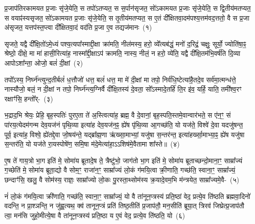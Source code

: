 \label{sec:startkanda3}
\setcounter{anuvakam}{0}
प्र॒जा\-प॑तिरकामयत प्र॒जाः सृ॑जे॒येति॒ स तपो॑\-ऽतप्यत॒ स स॒र्पान॑सृजत॒ सो॑\-ऽकामयत प्र॒जाः सृ॑जे॒येति॒ स द्वि॒तीय॑म\-तप्यत॒ स वयाꣴ॑स्यसृजत॒ सो॑\-ऽकामयत प्र॒जाः सृ॑जे॒येति॒ स तृ॒तीय॑मतप्यत॒ स ए॒तं दी᳚क्षितवा॒दम॑पश्य॒त्तम॑वद॒त्ततो॒ वै स प्र॒जा अ॑सृजत॒ यत्तप॑स्त॒प्त्वा दी᳚क्षितवा॒दं वद॑ति प्र॒जा ए॒व तद्यज॑मानः~(१)\ip

सृजते॒ यद्वै दी᳚क्षि॒तो॑\-ऽमे॒ध्यं पश्य॒त्यपा᳚स्माद्दी॒क्षा क्रा॑मति॒ नील॑मस्य॒ हरो॒ व्ये᳚त्यब॑द्धं॒ मनो॑ द॒रिद्रं॒ चक्षुः॒ सूर्यो॒ ज्योति॑षा॒ꣴ॒ श्रेष्ठो॒ दीक्षे॒ मा मा॑ हासी॒रित्या॑ह॒ नास्मा᳚द्दी॒क्षा\-ऽप॑ क्रामति॒ नास्य॒ नीलं॒ न हरो॒ व्ये॑ति॒ यद्वै दी᳚क्षि॒तम॑भि॒वर्\mbox{}ष॑ति दि॒व्या आपो\-ऽशा᳚न्ता॒ ओजो॒ बलं॑ दी॒क्षां~(२)\ip

तपो᳚\-ऽस्य॒ निर्घ्न॑न्त्युन्द॒तीर्बलं॑ ध॒त्तौजो॑ धत्त॒ बलं॑ धत्त॒ मा मे॑ दी॒क्षां मा तपो॒ निर्व॑धि॒ष्टेत्या॑है॒तदे॒व सर्व॑मा॒त्मन्ध॑त्ते॒ नास्यौजो॒ बलं॒ न दी॒क्षां न तपो॒ निर्घ्न॑न्त्य॒ग्निर्वै दी᳚क्षि॒तस्य॑ दे॒वता॒ सो᳚\-ऽस्मादे॒तर्\mbox{}हि॑ ति॒र इ॑व॒ यर्\mbox{}हि॒ याति॒ तमी᳚श्व॒रꣳ रक्षाꣳ॑सि॒ हन्तो᳚र्-~(३)\ip

भ॒द्राद॒भि श्रेयः॒ प्रेहि॒ बृह॒स्पतिः॑ पुरए॒ता ते॑ अ॒स्त्वित्या॑ह॒ ब्रह्म॒ वै दे॒वानां॒ बृह॒स्पति॒स्तमे॒वान्वार॑भते॒ स ए॑न॒ꣳ॒ सं पा॑रय॒त्येदम॑गन्म देव॒यज॑नं पृथि॒व्या इत्या॑ह देव॒यज॑न॒ꣴ॒ ह्ये॑ष पृ॑थि॒व्या आ॒गच्छ॑ति॒ यो यज॑ते॒ विश्वे॑ दे॒वा यदजु॑षन्त॒ पूर्व॒ इत्या॑ह॒ विश्वे॒ ह्ये॑तद्दे॒वा जो॒षय॑न्ते॒ यद्ब्रा᳚ह्म॒णा ऋ॑ख्सा॒माभ्यां॒ यजु॑षा स॒न्तर॑न्त॒ इत्या॑हर्ख्सा॒माभ्या॒ꣴ॒ ह्ये॑ष यजु॑षा स॒न्तर॑ति॒ यो यज॑ते रा॒यस्पोषे॑ण॒ समि॒षा म॑दे॒मेत्या॑हा॒\-ऽऽ\-शिष॑मे॒वैतामा शा᳚स्ते॥~(४)\ip

{\anuvakamend[{यज॑मानो दी॒क्षाꣳ हन्तो᳚र्ब्राह्म॒णाश्चतु॑र्विꣳशतिश्च}]}

ए॒ष ते॑ गाय॒त्रो भा॒ग इति॑ मे॒ सोमा॑य ब्रूतादे॒ष ते॒ त्रैष्टु॑भो॒ जाग॑तो भा॒ग इति॑ मे॒ सोमा॑य ब्रूताच्छन्दो॒माना॒ꣳ॒ साम्रा᳚ज्यं ग॒च्छेति॑ मे॒ सोमा॑य ब्रूता॒द्यो वै सोम॒ꣳ॒ राजा॑न॒ꣳ॒ साम्रा᳚ज्यं लो॒कं ग॑मयि॒त्वा क्री॒णाति॒ गच्छ॑ति॒ स्वाना॒ꣳ॒ साम्रा᳚ज्यं॒ छन्दाꣳ॑सि॒ खलु॒ वै सोम॑स्य॒ राज्ञः॒ साम्रा᳚ज्यो लो॒कः पु॒रस्ता॒थ्सोम॑स्य क्र॒यादे॒वम॒भि म॑न्त्रयेत॒ साम्रा᳚ज्यमे॒वै-~(५)\ip

नं॑ लो॒कं ग॑मयि॒त्वा क्री॑णाति॒ गच्छ॑ति॒ स्वाना॒ꣳ॒ साम्रा᳚ज्यं॒ यो वै ता॑नून॒प्त्रस्य॑ प्रति॒ष्ठां वेद॒ प्रत्ये॒व ति॑ष्ठति ब्रह्मवा॒दिनो॑ वदन्ति॒ न प्रा॒श्ञन्ति॒ न जु॑ह्व॒त्यथ॒ क्व॑ तानून॒प्त्रं प्रति॑ तिष्ठ॒तीति॑ प्र॒जा\-प॑तौ॒ मन॒सीति॑ ब्रूया॒त् त्रिरव॑ जिघ्रेत्प्र॒जा\-प॑तौ त्वा॒ मन॑सि जुहो॒मीत्ये॒षा वै ता॑नून॒प्त्रस्य॑ प्रति॒ष्ठा य ए॒वं वेद॒ प्रत्ये॒व ति॑ष्ठति॒ यो~(६)\ip

